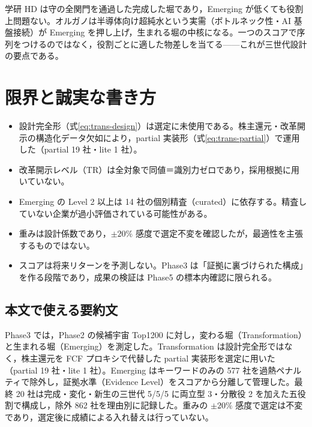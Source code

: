 \documentclass[a4paper,10pt]{article}
\begin{document}
学研 HD は守の全関門を通過した完成した堀であり，Emerging が低くても役割上問題ない。オルガノは半導体向け超純水という実需（ボトルネック性・AI 基盤接続）が Emerging を押し上げ，生まれる堀の中核になる。一つのスコアで序列をつけるのではなく，役割ごとに適した物差しを当てる——これが三世代設計の要点である。

\section{限界と誠実な書き方}
\label{sec:limits}

\begin{itemize}
\item 設計完全形（式\eqref{eq:trans-design}）は選定に未使用である。株主還元・改革開示の構造化データ欠如により，partial 実装形（式\eqref{eq:trans-partial}）で運用した（partial 19 社・lite 1 社）。
\item 改革開示レベル（TR）は全対象で同値＝識別力ゼロであり，採用根拠に用いていない。
\item Emerging の Level 2 以上は 14 社の個別精査（curated）に依存する。精査していない企業が過小評価されている可能性がある。
\item 重みは設計係数であり，$\pm20\%$ 感度で選定不変を確認したが，最適性を主張するものではない。
\item スコアは将来リターンを予測しない。Phase3 は「証拠に裏づけられた構成」を作る段階であり，成果の検証は Phase5 の標本内確認に限られる。
\end{itemize}

\subsection{本文で使える要約文}
\begin{keybox}
Phase3 では，Phase2 の候補宇宙 Top1200 に対し，変わる堀（Transformation）と生まれる堀（Emerging）を測定した。Transformation は設計完全形ではなく，株主還元を FCF プロキシで代替した partial 実装形を選定に用いた（partial 19 社・lite 1 社）。Emerging はキーワードのみの 577 社を過熱ペナルティで除外し，証拠水準（Evidence Level）をスコアから分離して管理した。最終 20 社は完成・変化・新生の三世代 5/5/5 に両立型 3・分散役 2 を加えた五役割で構成し，除外 862 社を理由別に記録した。重みの $\pm20\%$ 感度で選定は不変であり，選定後に成績による入れ替えは行っていない。
\end{keybox}

\newpage
\end{document}
